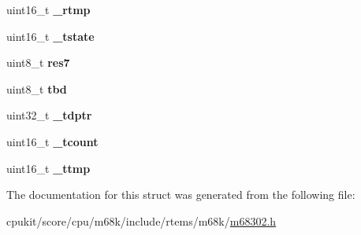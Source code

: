 \begin{DoxyCompactItemize}
uint16\+\_\+t {\bfseries \+\_\+rtmp}
\item 
\mbox{\label{structm302__SCC__parameters__t_a50f77e8b1dc9e8b277a66be5c73a32ba}} 
uint16\+\_\+t {\bfseries \+\_\+tstate}
\item 
\mbox{\label{structm302__SCC__parameters__t_a770bb4b7f0143ca72114e9936430e601}} 
uint8\+\_\+t {\bfseries res7}
\item 
\mbox{\label{structm302__SCC__parameters__t_a7763e5c3ed502aea7265afd8c7a73c81}} 
uint8\+\_\+t {\bfseries tbd}
\item 
\mbox{\label{structm302__SCC__parameters__t_ae9ae01bd3dfc6b4ffba7af5412881323}} 
uint32\+\_\+t {\bfseries \+\_\+tdptr}
\item 
\mbox{\label{structm302__SCC__parameters__t_ad1087634a4e31e02c455b03922a7f2e1}} 
uint16\+\_\+t {\bfseries \+\_\+tcount}
\item 
\mbox{\label{structm302__SCC__parameters__t_a1496a5a1bd07efba376fe84acd31a554}} 
uint16\+\_\+t {\bfseries \+\_\+ttmp}
\end{DoxyCompactItemize}


The documentation for this struct was generated from the following file\+:\begin{DoxyCompactItemize}
\item 
cpukit/score/cpu/m68k/include/rtems/m68k/\mbox{\hyperlink{m68302_8h}{m68302.\+h}}\end{DoxyCompactItemize}
